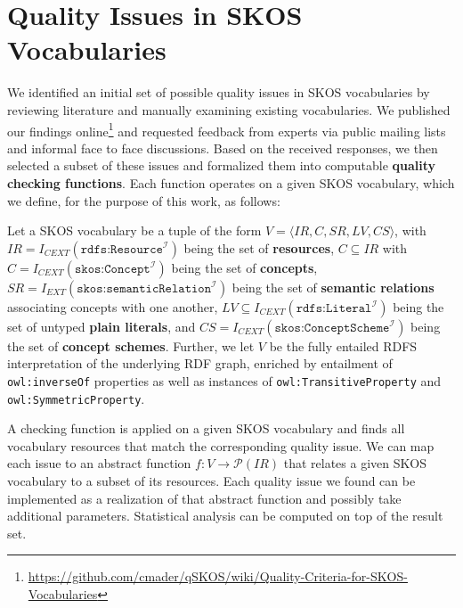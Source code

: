 
\section{Quality Issues in SKOS Vocabularies}\label{sec:criteria}


We identified an initial set of possible quality issues in SKOS vocabularies by reviewing literature and manually examining existing vocabularies. We published our findings online\footnote{\url{https://github.com/cmader/qSKOS/wiki/Quality-Criteria-for-SKOS-Vocabularies}} and requested feedback from experts via public mailing lists and informal face to face discussions. Based on the received responses, we then selected a subset of these issues and formalized them into computable \textbf{quality checking functions}. Each function operates on a given SKOS vocabulary, which we define, for the purpose of this work, as follows:

\begin{mydef}
Let a SKOS vocabulary be a tuple of the form $V = \langle IR, C, SR, LV, CS \rangle$, with \(IR = I_{CEXT}(\texttt{rdfs:Resource}^\mathcal{I})\) being the set of \textbf{resources}, \(C \subseteq IR\) with \(C = I_{CEXT}(\texttt{skos:Concept}^\mathcal{I})\) being the set of \textbf{concepts}, \(SR = I_{EXT}(\texttt{skos:semanticRelation}^\mathcal{I})\) being the set of \textbf{semantic relations} associating concepts with one another, $LV \subseteq I_{CEXT}(\texttt{rdfs:Literal}^\mathcal{I})$ being the set of untyped \textbf{plain literals}, and \(CS = I_{CEXT}(\texttt{skos:ConceptScheme}^\mathcal{I})\) being the set of \textbf{concept schemes}. Further, we let $V$ be the fully entailed RDFS interpretation of the underlying RDF graph, enriched by entailment of \texttt{owl:inverseOf} properties as well as instances of \texttt{owl:TransitiveProperty} and \texttt{owl:SymmetricProperty}. 
\end{mydef}

A checking function is applied on a given SKOS vocabulary and finds all vocabulary resources that match the corresponding quality issue. We can map each issue to an abstract function $f:V \rightarrow \mathcal{P}(IR)$ that relates a given SKOS vocabulary to a subset of its resources. Each quality issue we found can be implemented as a realization of that abstract function and possibly take additional parameters. Statistical analysis can be computed on top of the result set.

